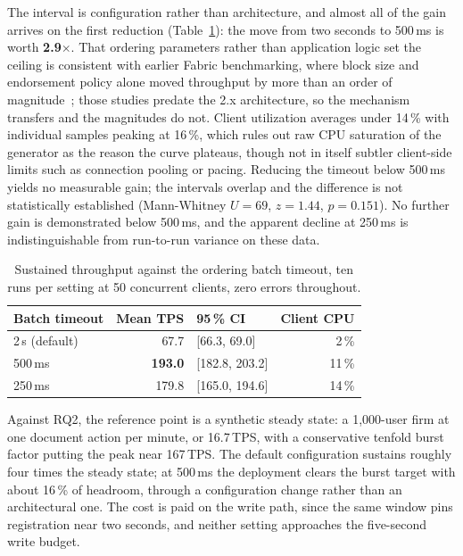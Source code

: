 \documentclass[preprint,12pt]{elsarticle}
\begin{document}
The interval is configuration rather than architecture, and almost all of the
gain arrives on the first reduction (Table~\ref{tab:batchtimeout}): the move
from two seconds to 500\,ms is worth \textbf{2.9$\times$}. That ordering
parameters rather than application logic set the ceiling is consistent with
earlier Fabric benchmarking, where block size and endorsement policy alone moved
throughput by more than an order of
magnitude~\cite{thakkar2018performance,kuzlu2019performance}; those studies
predate the 2.x architecture, so the mechanism transfers and the magnitudes do
not. Client utilization
averages under 14\,\% with individual samples peaking at 16\,\%, which rules
out raw CPU saturation of the generator as the reason the curve plateaus,
though not in itself subtler client-side limits such as connection pooling or
pacing. Reducing the timeout below 500\,ms yields no measurable gain; the intervals
overlap and the difference is not statistically established (Mann-Whitney
$U = 69$, $z = 1.44$, $p = 0.151$). No further gain is demonstrated below
500\,ms, and the apparent decline at 250\,ms is indistinguishable from
run-to-run variance on these data.

\begin{table}[!t]
\centering
\caption{Sustained throughput against the ordering batch timeout, ten runs per
setting at 50 concurrent clients, zero errors throughout.}
\label{tab:batchtimeout}
\footnotesize
\setlength{\tabcolsep}{6pt}
\begin{tabular}{@{}lrlr@{}}
\toprule
Batch timeout & Mean TPS & 95\,\% CI & Client CPU \\
\midrule
2\,s (default) & 67.7  & [66.3, 69.0]   & 2\,\% \\
500\,ms        & \textbf{193.0} & [182.8, 203.2] & 11\,\% \\
250\,ms        & 179.8 & [165.0, 194.6] & 14\,\% \\
\bottomrule
\end{tabular}
\end{table}

Against RQ2, the reference point is a synthetic steady state: a 1{,}000-user
firm at one document action per minute, or 16.7\,TPS, with a conservative
tenfold burst factor putting the peak near 167\,TPS. The default configuration
sustains roughly four times the steady state; at 500\,ms the deployment clears
the burst target with about 16\,\% of headroom, through a configuration change
rather than an architectural one. The cost is paid on the write path, since the
same window pins registration near two seconds, and neither setting approaches
the five-second write budget.
\end{document}
